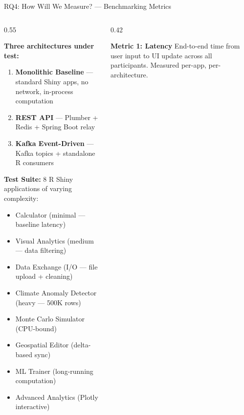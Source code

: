 \documentclass[aspectratio=169]{beamer}
\begin{document}
\begin{frame}{RQ4: How Will We Measure? --- Benchmarking Metrics}

\begin{columns}[T]
\begin{column}{0.55\textwidth}

\textbf{Three architectures under test:}
\begin{enumerate}
    \item \textbf{Monolithic Baseline} --- standard Shiny apps, no network, in-process computation
    \item \textbf{REST API} --- Plumber + Redis + Spring Boot relay
    \item \textbf{Kafka Event-Driven} --- Kafka topics + standalone R consumers
\end{enumerate}

\vspace{0.5em}
\textbf{Test Suite:} 8 R Shiny applications of varying complexity:
\begin{itemize}
    \item[\faCalculator] Calculator (minimal --- baseline latency)
    \item[\faChartBar] Visual Analytics (medium --- data filtering)
    \item[\faUpload] Data Exchange (I/O --- file upload + cleaning)
    \item[\faThermometerHalf] Climate Anomaly Detector (heavy --- 500K rows)
    \item[\faDice] Monte Carlo Simulator (CPU-bound)
    \item[\faMapMarkerAlt] Geospatial Editor (delta-based sync)
    \item[\faBrain] ML Trainer (long-running computation)
    \item[\faChartLine] Advanced Analytics (Plotly interactive)
\end{itemize}

\end{column}
\begin{column}{0.42\textwidth}

\begin{block}{\textbf{Metric 1: Latency}}
\small
End-to-end time from user input to UI update across all participants. Measured per-app, per-architecture.
\end{block}


\end{column}
\end{columns}
\end{frame}
\end{document}
